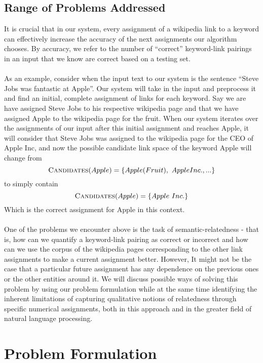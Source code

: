 \documentclass[twoside,11pt]{article}
\begin{document}
\subsection{Range of Problems Addressed}

It is crucial that in our system, every assignment of a wikipedia link to a keyword can effectively increase the accuracy of the next assignments our algorithm chooses. By accuracy, we refer to the number of ``correct'' keyword-link pairings in an input that we know are correct based on a testing set.
\\ \\
As an example, consider when the input text to our system is the sentence ``Steve Jobs was fantastic at Apple''. Our system will take in the input and preprocess it and find an initial, complete assignment of links for each keyword. Say we are have assigned Steve Jobs to his respective wikipedia page and that we have assigned Apple to the wikipedia page for the fruit. When our system iterates over the assignments of our input after this initial assignment and reaches Apple, it will consider that Steve Jobs was assigned to the wikipedia page for the CEO of Apple Inc, and now the possible candidate link space of the keyword Apple will change from
$$\mbox{{\sc Candidates}}(Apple) = \{Apple (Fruit), \ Apple Inc., ...\}$$
to simply contain
$$\mbox{{\sc Candidates}}(Apple) = \{Apple \ Inc.\}$$
Which is the correct assignment for Apple in this context.
\\ \\
One of the problems we encounter above is the task of semantic-relatedness - that is, how can we quantify a keyword-link pairing as correct or incorrect and how can we use the corpus of the wikipedia pages corresponding to the other link assignments to make a current assignment better. However, It might not be the case that a particular future assignment has any dependence on the previous ones or the other entities around it. We will discuss possible ways of solving this problem by using our problem formulation while at the same time identifying the inherent limitations of capturing qualitative notions of relatedness through specific numerical assignments, both in this approach and in the greater field of natural language processing.

\section{Problem Formulation}
\end{document}
